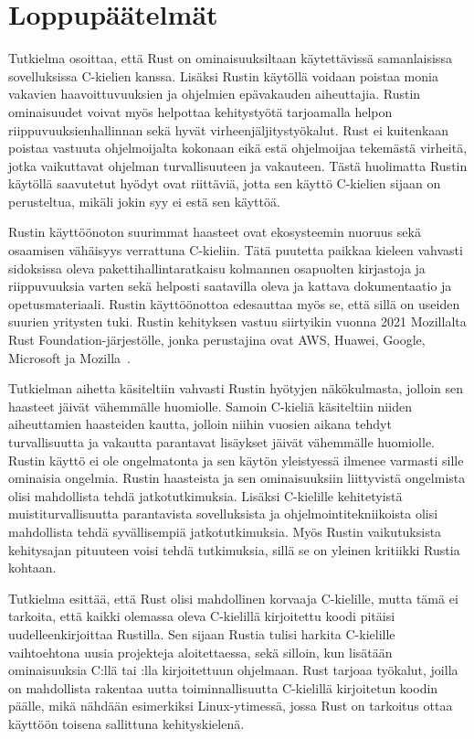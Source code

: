 \chapter{Loppupäätelmät} \label{Loppupäätelmät}

Tutkielma osoittaa, että Rust on ominaisuuksiltaan käytettävissä samanlaisissa sovelluksissa C-kielien kanssa. Lisäksi Rustin käytöllä voidaan poistaa monia vakavien haavoittuvuuksien ja ohjelmien epävakauden aiheuttajia. Rustin ominaisuudet voivat myös helpottaa kehitystyötä tarjoamalla helpon riippuvuuksienhallinnan sekä hyvät virheenjäljitystyökalut. Rust ei kuitenkaan poistaa vastuuta ohjelmoijalta kokonaan eikä estä ohjelmoijaa tekemästä virheitä, jotka vaikuttavat ohjelman turvallisuuteen ja vakauteen. Tästä huolimatta Rustin käytöllä saavutetut hyödyt ovat riittäviä, jotta sen käyttö C-kielien sijaan on perusteltua, mikäli jokin syy ei estä sen käyttöä.

Rustin käyttöönoton suurimmat haasteet ovat ekosysteemin nuoruus sekä osaamisen vähäisyys verrattuna C-kieliin. Tätä puutetta paikkaa kieleen vahvasti sidoksissa oleva pakettihallintaratkaisu kolmannen osapuolten kirjastoja ja riippuvuuksia varten sekä helposti saatavilla oleva ja kattava dokumentaatio ja opetusmateriaali. Rustin käyttöönottoa edesauttaa myös se, että sillä on useiden suurien yritysten tuki. Rustin kehityksen vastuu siirtyikin vuonna 2021 Mozillalta Rust Foundation-järjestölle, jonka perustajina ovat AWS, Huawei, Google, Microsoft ja Mozilla~\cite{rustfoundation}.

Tutkielman aihetta käsiteltiin vahvasti Rustin hyötyjen näkökulmasta, jolloin sen haasteet jäivät vähemmälle huomiolle. Samoin C-kieliä käsiteltiin niiden aiheuttamien haasteiden kautta, jolloin niihin vuosien aikana tehdyt turvallisuutta ja vakautta parantavat lisäykset jäivät vähemmälle huomiolle. Rustin käyttö ei ole ongelmatonta ja sen käytön yleistyessä ilmenee varmasti sille ominaisia ongelmia. Rustin haasteista ja sen ominaisuuksiin liittyvistä ongelmista olisi mahdollista tehdä jatkotutkimuksia. Lisäksi C-kielille kehitetyistä muistiturvallisuutta parantavista sovelluksista ja ohjelmointitekniikoista olisi mahdollista tehdä syvällisempiä jatkotutkimuksia. Myös Rustin vaikutuksista kehitysajan pituuteen voisi tehdä tutkimuksia, sillä se on yleinen kritiikki Rustia kohtaan.

Tutkielma esittää, että Rust olisi mahdollinen korvaaja C-kielille, mutta tämä ei tarkoita, että kaikki olemassa oleva C-kielillä kirjoitettu koodi pitäisi uudelleenkirjoittaa Rustilla. Sen sijaan Rustia tulisi harkita C-kielille vaihtoehtona uusia projekteja aloitettaessa, sekä silloin, kun lisätään ominaisuuksia C:llä tai \Cpp:lla kirjoitettuun ohjelmaan. Rust tarjoaa työkalut, joilla on mahdollista rakentaa uutta toiminnallisuutta C-kielillä kirjoitetun koodin päälle, mikä nähdään esimerkiksi Linux-ytimessä, jossa Rust on tarkoitus ottaa käyttöön toisena sallittuna kehityskielenä.